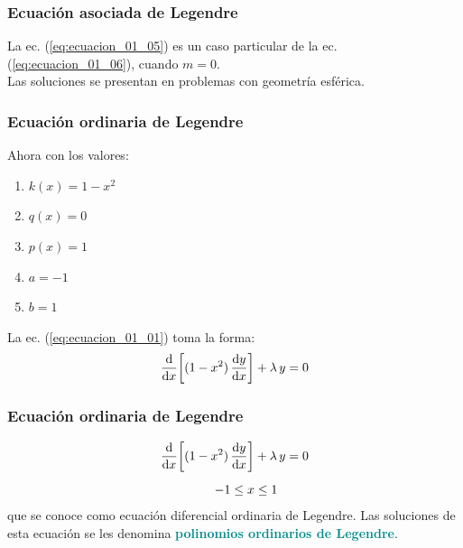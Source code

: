 \documentclass[12pt]{beamer}
\begin{document}
\begin{frame}
\frametitle{Ecuación asociada de Legendre}
La ec. (\ref{eq:ecuacion_01_05}) es un caso particular de la ec. (\ref{eq:ecuacion_01_06}), cuando $m = 0$.
\\
\bigskip
\pause
Las soluciones se presentan en problemas con geometría esférica.
\end{frame}
\begin{frame}
\frametitle{Ecuación ordinaria de Legendre}
Ahora con los valores:
\pause
{}
\begin{multicols}{2}
\begin{enumerate}[<+->]
\item $k(x) = 1 - x^{2}$
\item $q(x) = 0$
\item $p(x) = 1$
\item $a = -1$
\item $b = 1$
\end{enumerate}
\end{multicols}
\pause
La ec. (\ref{eq:ecuacion_01_01}) toma la forma:
\begin{align}
\dv{x} \bigg[ (1 - x^{2}) \, \dv{y}{x} \bigg] + \lambda \, y = 0
\label{eq:ecuacion_01_05}
\end{align}
\end{frame}
\begin{frame}
\frametitle{Ecuación ordinaria de Legendre}
\begin{align*}
\dv{x} \bigg[ (1 - x^{2}) \, &\dv{y}{x} \bigg] + \lambda \, y = 0 \\[0.5em]
-1 &\leq x \leq 1
\end{align*}
\pause
que se conoce como \textcolor{cobalt}{ecuación diferencial ordinaria de Legendre}. \pause Las soluciones de esta ecuación se les denomina \textbf{\textcolor{darkcyan}{polinomios ordinarios de Legendre}}.
\end{frame}
\end{document}
